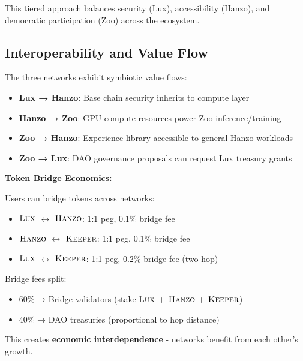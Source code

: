 This tiered approach balances security (Lux), accessibility (Hanzo), and democratic participation (Zoo) across the ecosystem.

\subsection{Interoperability and Value Flow}

The three networks exhibit symbiotic value flows:

\begin{itemize}
\item \textbf{Lux → Hanzo}: Base chain security inherits to compute layer
\item \textbf{Hanzo → Zoo}: GPU compute resources power Zoo inference/training
\item \textbf{Zoo → Hanzo}: Experience library accessible to general Hanzo workloads
\item \textbf{Zoo → Lux}: DAO governance proposals can request Lux treasury grants
\end{itemize}

\textbf{Token Bridge Economics:}

Users can bridge tokens across networks:
\begin{itemize}
\item $\textsc{Lux}$ $\leftrightarrow$ $\textsc{Hanzo}$: 1:1 peg, 0.1\% bridge fee
\item $\textsc{Hanzo}$ $\leftrightarrow$ $\textsc{Keeper}$: 1:1 peg, 0.1\% bridge fee
\item $\textsc{Lux}$ $\leftrightarrow$ $\textsc{Keeper}$: 1:1 peg, 0.2\% bridge fee (two-hop)
\end{itemize}

Bridge fees split:
\begin{itemize}
\item 60\% → Bridge validators (stake $\textsc{Lux}$ + $\textsc{Hanzo}$ + $\textsc{Keeper}$)
\item 40\% → DAO treasuries (proportional to hop distance)
\end{itemize}

This creates \textbf{economic interdependence} - networks benefit from each other's growth.

